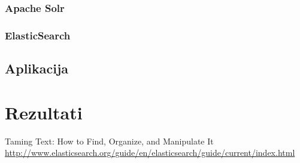 \documentclass[11pt]{scrreprt}
\begin{document}
\subsection{Apache Solr}

\subsection{ElasticSearch}

\section{Aplikacija}

\chapter{Rezultati}

\begin{thebibliography}{99}
   Taming Text: How to Find, Organize, and Manipulate It
   \url{http://www.elasticsearch.org/guide/en/elasticsearch/guide/current/index.html}
\end{thebibliography}
\end{document}
